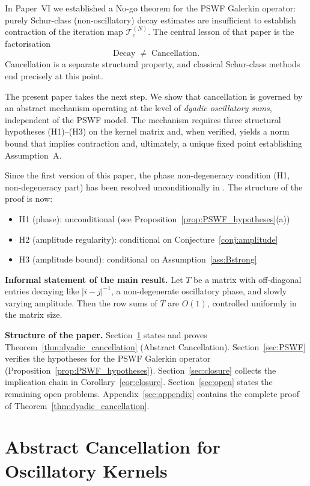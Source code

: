 \documentclass[12pt]{amsart}
\theoremstyle{definition}
\theoremstyle{remark}
\begin{document}
In Paper~VI \cite{paperVI} we established a No-go theorem
for the PSWF Galerkin operator:\,purely Schur-class
(non-oscillatory) decay estimates are insufficient to
establish contraction of the iteration map $\mathcal{T}_c^{(N)}$.
The central lesson of that paper is the factorisation
\[
  \text{Decay} \;\neq\; \text{Cancellation}.
\]
Cancellation is a separate structural property, and
classical Schur-class methods end precisely at this point.

The present paper takes the next step.
We show that cancellation is governed by an abstract mechanism
operating at the level of \emph{dyadic oscillatory sums},
independent of the PSWF model.
The mechanism requires three structural hypotheses
(H1)--(H3) on the kernel matrix and, when verified,
yields a norm bound that implies contraction and,
ultimately, a unique fixed point establishing Assumption~A.

Since the first version of this paper,
the phase non-degeneracy condition (H1, non-degeneracy part)
has been resolved unconditionally in \cite{PhaseNondeg}.
The structure of the proof is now:
\begin{itemize}
  \item H1 (phase): unconditional (see Proposition~\ref{prop:PSWF_hypotheses}(a))
  \item H2 (amplitude regularity): conditional on Conjecture~\ref{conj:amplitude}
  \item H3 (amplitude bound): conditional on Assumption~\ref{ass:Bstrong}
\end{itemize}

\medskip\noindent
\textbf{Informal statement of the main result.}
Let $T$ be a matrix with off-diagonal entries decaying
like $|i-j|^{-1}$, a non-degenerate oscillatory phase,
and slowly varying amplitude.
Then the row sums of $T$ are $O(1)$, controlled
uniformly in the matrix size.

\medskip\noindent
\textbf{Structure of the paper.}
Section~\ref{sec:cancellation} states and proves
Theorem~\ref{thm:dyadic_cancellation} (Abstract Cancellation).
Section~\ref{sec:PSWF} verifies the hypotheses for the PSWF
Galerkin operator (Proposition~\ref{prop:PSWF_hypotheses}).
Section~\ref{sec:closure} collects the implication chain
in Corollary~\ref{cor:closure}.
Section~\ref{sec:open} states the remaining open problems.
Appendix~\ref{sec:appendix} contains the complete proof
of Theorem~\ref{thm:dyadic_cancellation}.

\section{Abstract Cancellation for Oscillatory Kernels}
\label{sec:cancellation}
\end{document}
